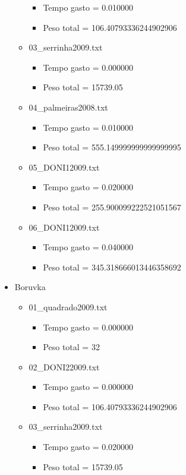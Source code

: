 \documentclass[12pt,a4paper]{article}
\begin{document}
\begin{itemize}
\begin{itemize}
\begin{itemize}
\item Tempo gasto = 0.010000 
\item Peso total = 106.40793336244902906 
\end{itemize}
\item 03\_serrinha2009.txt
\begin{itemize}
\item Tempo gasto = 0.000000 
\item Peso total = 15739.05 
\end{itemize}
\item 04\_palmeiras2008.txt
\begin{itemize}
\item Tempo gasto = 0.010000 
\item Peso total = 555.149999999999999995 
\end{itemize}
\item 05\_DONI12009.txt
\begin{itemize}
\item Tempo gasto = 0.020000 
\item Peso total = 255.900099222521051567 
\end{itemize}
\item 06\_DONI12009.txt
\begin{itemize}
\item Tempo gasto = 0.040000 
\item Peso total = 345.318666013446358692 
\end{itemize}
\end{itemize}
\item Boruvka
\begin{itemize}
\item 01\_quadrado2009.txt
\begin{itemize}
\item Tempo gasto = 0.000000
\item Peso total = 32
\end{itemize}
\item 02\_DONI22009.txt
\begin{itemize}
\item Tempo gasto = 0.000000
\item Peso total = 106.40793336244902906
\end{itemize}
\item 03\_serrinha2009.txt
\begin{itemize}
\item Tempo gasto = 0.020000
\item Peso total = 15739.05

\end{itemize}
\end{itemize}
\end{itemize}
\end{document}
